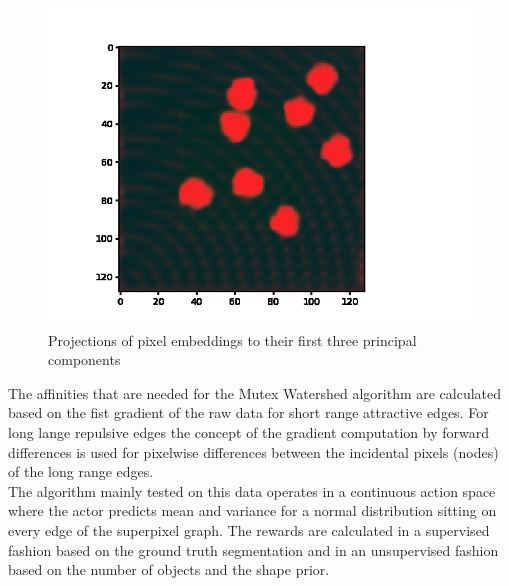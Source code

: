 \begin{figure}[ht!]
	\centering
	\includegraphics[width=.5\textwidth]{figures/plots/pix_embeddings.png}
	\caption{Projections of pixel embeddings to their first three principal components}
	\label{fig:pixembeddings}
\end{figure}

The affinities that are needed for the Mutex Watershed algorithm are calculated based on the fist gradient of the raw data for short range attractive edges. For long lange repulsive edges the concept of the gradient computation by forward differences is used for pixelwise differences between the incidental pixels (nodes) of the long range edges.\\
The algorithm mainly tested on this data operates in a continuous action space where the actor predicts mean and variance for a normal distribution sitting on every edge of the superpixel graph. The rewards are calculated in a supervised fashion based on the ground truth segmentation and in an unsupervised fashion based on the number of objects and the shape prior.\\
